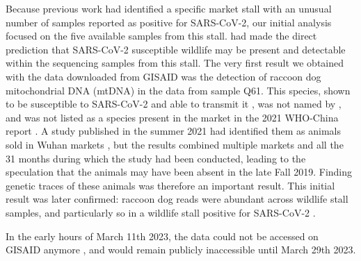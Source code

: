 \documentclass[11pt]{article}
\def \sct {\mbox{SARS-CoV-2}}
\begin{document}
Because previous work \citep{Worobey2022Science} had identified a specific market stall with an unusual number of samples reported as positive for \sct{}, our initial analysis focused on the five available samples from this stall. \citet{Worobey2022Science} had made the direct prediction that \sct{} susceptible wildlife may be present and detectable within the sequencing samples from this stall. The very first result we obtained with the data downloaded from GISAID was the detection of raccoon dog mitochondrial DNA (mtDNA) in the data from sample Q61. This species, shown to be susceptible to \sct{} and able to transmit it \citep{Freuling2020EID}, was not named by \citet{Liu2022RS}, and was not listed as a species present in the market in the 2021 WHO-China report \citep{WHO2021}. A study published in the summer 2021 had identified them as animals sold in Wuhan markets \citep{Xiao2021SciRep}, but the results combined multiple markets and all the 31 months during which the study had been conducted, leading to the speculation that the animals may have been absent in the late Fall 2019. Finding genetic traces of these animals was therefore an important result. This initial result was later confirmed: raccoon dog reads were abundant across wildlife stall samples, and particularly so in a wildlife stall positive for \sct{} \citep{ACC2023bioRxiv}.

In the early hours of March 11th 2023, the data could not be accessed on GISAID anymore \citep[foreword]{ACC2023Zenodo}, and would remain publicly inaccessible until March 29th 2023. 
\end{document}
